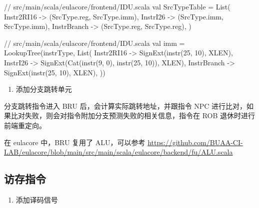 \begin{CodeBlock}[language=BookScala]
// src/main/scala/eulacore/frontend/IDU.scala
val SrcTypeTable = List(
    Instr2RI16  -> (SrcType.reg, SrcType.imm),
    InstrI26    -> (SrcType.imm, SrcType.imm),
    InstrBranch -> (SrcType.reg, SrcType.reg),
  )
\end{CodeBlock}

\begin{CodeBlock}[language=BookScala]
// src/main/scala/eulacore/frontend/IDU.scala
 val imm = LookupTree(instrType, List(
    Instr2RI16    -> SignExt(instr(25, 10), XLEN),
    InstrI26      -> SignExt(Cat(instr(9, 0), instr(25, 10)), XLEN),
    InstrBranch   -> SignExt(instr(25, 10), XLEN),
  ))
\end{CodeBlock}

\begin{enumerate}
\def\labelenumi{\arabic{enumi}.}
\setcounter{enumi}{1}
\tightlist
\item
  添加分支跳转单元
\end{enumerate}

分支跳转指令进入 BRU 后，会计算实际跳转地址，并跟指令 NPC 进行比对，如果比对失败，则会对指令附加分支预测失败的相关信息，指令在 ROB 退休时进行前端重定向。

在 eulacore 中，BRU 复用了 ALU，可以参考 \url{https://github.com/BUAA-CI-LAB/eulacore/blob/main/src/main/scala/eulacore/backend/fu/ALU.scala}

\subsection{访存指令}\label{sec:06-more-instructions-009}

\begin{enumerate}
\def\labelenumi{\arabic{enumi}.}
\tightlist
\item
  添加译码信号
\end{enumerate}

